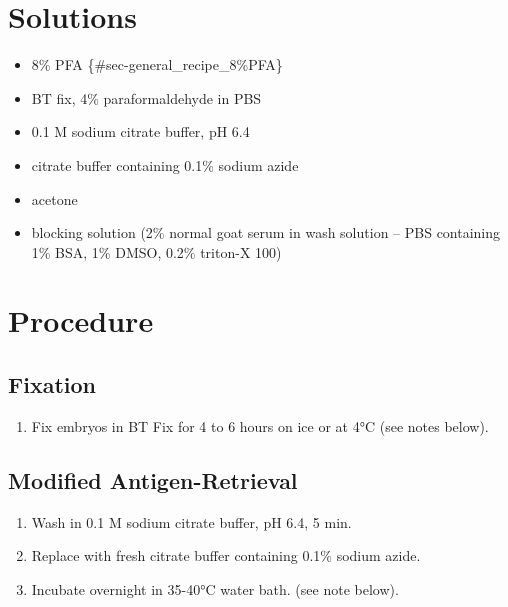 \documentclass[
  letterpaper,
  DIV=11,
  numbers=noendperiod]{scrreprt}
\providecommand{\tightlist}{%
  \setlength{\itemsep}{0pt}\setlength{\parskip}{0pt}}\usepackage{longtable,booktabs,array}
\begin{document}
\hypertarget{solutions-59}{%
\section{Solutions}\label{solutions-59}}

\begin{itemize}
\tightlist
\item
  8\% PFA \{\#sec-general\_recipe\_8\%PFA\}
\item
  BT fix, 4\% paraformaldehyde in PBS
\item
  0.1 M sodium citrate buffer, pH 6.4
\item
  citrate buffer containing 0.1\% sodium azide
\item
  acetone
\item
  blocking solution (2\% normal goat serum in wash solution -- PBS
  containing 1\% BSA, 1\% DMSO, 0.2\% triton-X 100)
\end{itemize}

\hypertarget{procedure-66}{%
\section{Procedure}\label{procedure-66}}

\hypertarget{fixation}{%
\subsection{Fixation}\label{fixation}}

\begin{enumerate}
\def\labelenumi{\arabic{enumi}.}
\tightlist
\item
  Fix embryos in BT Fix for 4 to 6 hours on ice or at 4°C (see notes
  below).
\end{enumerate}

\hypertarget{modified-antigen-retrieval}{%
\subsection{Modified
Antigen-Retrieval}\label{modified-antigen-retrieval}}

\begin{enumerate}
\def\labelenumi{\arabic{enumi}.}
\setcounter{enumi}{1}
\tightlist
\item
  Wash in 0.1 M sodium citrate buffer, pH 6.4, 5 min.
\item
  Replace with fresh citrate buffer containing 0.1\% sodium azide.
\item
  Incubate overnight in 35-40°C water bath. (see note below).
\end{enumerate}
\end{document}
